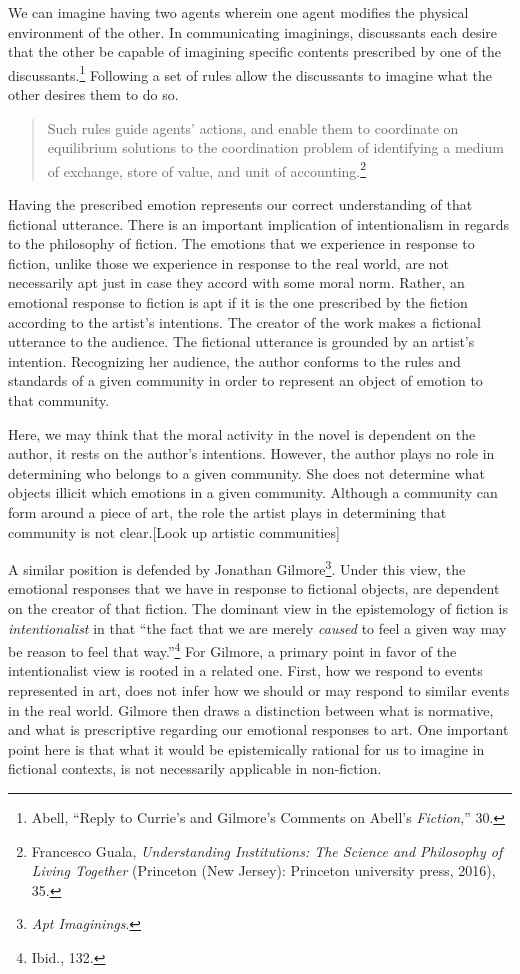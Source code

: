 \documentclass[
  12pt,
]{book}
\theoremstyle{definition}
\theoremstyle{definition}
\theoremstyle{definition}
\theoremstyle{definition}
\theoremstyle{remark}
\begin{document}
We can imagine having two agents wherein one agent modifies the physical environment of the other. In communicating imaginings, discussants each desire that the other be capable of imagining specific contents prescribed by one of the discussants.\footnote{Abell, {``Reply to {Currie}'s and {Gilmore}'s Comments on {Abell}'s {\emph{Fiction}},''} 30.} Following a set of rules allow the discussants to imagine what the other desires them to do so.

\begin{quote}
Such rules guide agents' actions, and enable them to coordinate on equilibrium solutions to the coordination problem of identifying a medium of exchange, store of value, and unit of accounting.\footnote{Francesco Guala, \emph{Understanding {Institutions}: {The Science} and {Philosophy} of {Living Together}} (Princeton (New Jersey): Princeton university press, 2016), 35.}
\end{quote}

Having the prescribed emotion represents our correct understanding of that fictional utterance. There is an important implication of intentionalism in regards to the philosophy of fiction. The emotions that we experience in response to fiction, unlike those we experience in response to the real world, are not necessarily apt just in case they accord with some moral norm. Rather, an emotional response to fiction is apt if it is the one prescribed by the fiction according to the artist's intentions. The creator of the work makes a fictional utterance to the audience. The fictional utterance is grounded by an artist's intention. Recognizing her audience, the author conforms to the rules and standards of a given community in order to represent an object of emotion to that community.

Here, we may think that the moral activity in the novel is dependent on the author, it rests on the author's intentions. However, the author plays no role in determining who belongs to a given community. She does not determine what objects illicit which emotions in a given community. Although a community can form around a piece of art, the role the artist plays in determining that community is not clear.{[}Look up artistic communities{]}

A similar position is defended by Jonathan Gilmore\footnote{\emph{Apt {Imaginings}}.}. Under this view, the emotional responses that we have in response to fictional objects, are dependent on the creator of that fiction. The dominant view in the epistemology of fiction is \emph{intentionalist} in that ``the fact that we are merely \emph{caused} to feel a given way may be reason to feel that way.''\footnote{Ibid., 132.} For Gilmore, a primary point in favor of the intentionalist view is rooted in a related one. First, how we respond to events represented in art, does not infer how we should or may respond to similar events in the real world. Gilmore then draws a distinction between what is normative, and what is prescriptive regarding our emotional responses to art. One important point here is that what it would be epistemically rational for us to imagine in fictional contexts, is not necessarily applicable in non-fiction.
\end{document}
